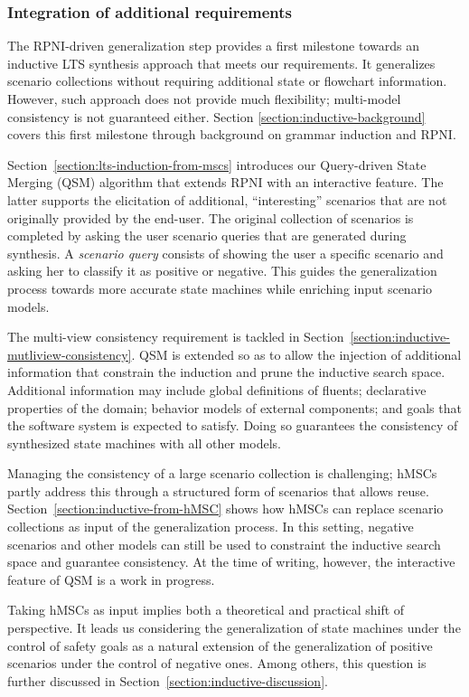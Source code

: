 \subsubsection*{Integration of additional requirements}

The RPNI-driven generalization step provides a first milestone towards an inductive LTS synthesis approach that meets our requirements. It generalizes scenario collections without requiring additional state or flowchart information. However, such approach does not provide much flexibility; multi-model consistency is not guaranteed either. Section \ref{section:inductive-background} covers this first milestone through background on grammar induction and RPNI.

Section~\ref{section:lts-induction-from-mscs} introduces our Query-driven State Merging (QSM) algorithm that extends RPNI with an interactive feature. The latter supports the elicitation of additional, ``interesting'' scenarios that are not originally provided by the end-user. The original collection of scenarios is completed by asking the user scenario queries that are generated during synthesis. A \emph{scenario query} consists of showing the user a specific scenario and asking her to classify it as positive or negative. This guides the generalization process towards more accurate state machines while enriching input scenario models.

The multi-view consistency requirement is tackled in Section~\ref{section:inductive-mutliview-consistency}. QSM is extended so as to allow the injection of additional information that constrain the induction and prune the inductive search space. Additional information may include global definitions of fluents; declarative properties of the domain; behavior models of external components; and goals that the software system is expected to satisfy. Doing so guarantees the consistency of synthesized state machines with all other models.

Managing the consistency of a large scenario collection is challenging; hMSCs partly address this through a structured form of scenarios that allows reuse. Section~\ref{section:inductive-from-hMSC} shows how hMSCs can replace scenario collections as input of the generalization process. In this setting, negative scenarios and other models can still be used to constraint the inductive search space and guarantee consistency. At the time of writing, however, the interactive feature of QSM is a work in progress.

Taking hMSCs as input implies both a theoretical and practical shift of perspective. It leads us considering the generalization of state machines under the control of safety goals as a natural extension of the generalization of positive scenarios under the control of negative ones. Among others, this question is further discussed in Section~\ref{section:inductive-discussion}.
